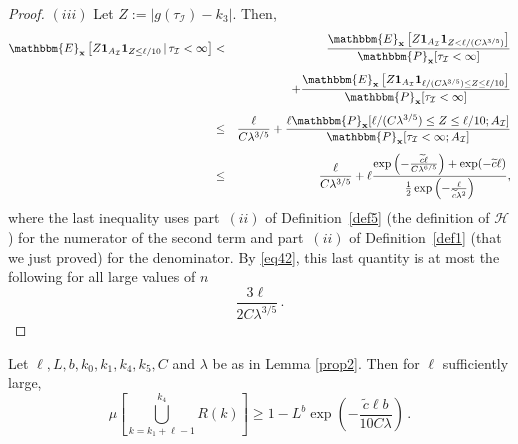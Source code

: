 \documentclass[final,12pt]{colt2018} %
\newcommand{\E}{\mathbbm{E}}
\renewcommand{\P}{\mathbbm{P}}
\newcommand{\1}{\mathbf{1}}
\def\disp{\displaystyle}
\def\cI{\mathcal{I}}
\newcommand{\wt}{\widetilde}
\def\x{{\bf x}}
\def\ct{{\wt c}}
\def\Rc{{\mathcal H}}
\begin{document}
\begin{proof}
	$(iii)$ Let $Z := |g(\tau_{\cI}) - k_3|$.  Then,
	\begin{eqnarray*}
		\E_\x \left [ Z \1_{A_{\cI}} \1_{Z \leq \ell / 10}
		\, | \,\tau_{\cI} < \infty \right ]
		& < & \frac{\E_\x \left [ Z \1_{A_{\cI}}
			\1_{Z < \ell / (C \lambda^{3/5}) } \right ]}
		{\P_{\x} [ \tau_{\cI}<\infty ]} \\[1ex]
		&& + \frac{\E_\x \left [ Z \1_{A_{\cI}}
			\1_{\ell / (C\lambda^{3/5}) \leq Z \leq \ell/10 }
			\right]}{\P_\x [ \tau_{\cI} < \infty ]} \\[1ex]
		& \leq & \frac{\ell}{C\lambda^{3/5}} +
		\frac{\ell\P_{\x} [ \ell / (C\lambda^{3/5})
			\leq Z \leq \ell/10;A_{\cI}]}{\P_\x [\tau_{\cI}<\infty;A_{\cI} ]}\\[1ex]
		& \leq & \frac{\ell}{C\lambda^{3/5}} +
		\ell
		\frac{\exp \left( -\frac{\ct \ell}{C\lambda^{6/5} }
			\right) + \exp(-\wt c\ell) }{ \frac 12 \exp \left(-\frac{\ell}{\ct \lambda^2} \right)},
	\end{eqnarray*}
	where the last inequality uses part~$(ii)$ of Definition~\ref{def5}
	(the definition of $\Rc$) for the numerator of the second term and
	part~$(ii)$ of Definition~\ref{def1} (that we just proved) for the
	denominator.  By \eqref{eq42}, this last quantity is at most the following for all large values of $n$
	$$\disp \frac{3\ell}{2C\lambda^{3/5}} \, .$$
\end{proof}

\begin{lemma} \label{prop10}
	Let $\ell, L, b, k_0, k_1, k_4, k_5, C$ and $\lambda$ be as in
	Lemma \ref{prop2}.  Then for $\ell$ sufficiently large,
	$$\mu \left [ \bigcup_{k = k_1 + \ell - 1}^{k_4} R(k) \right ] \geq
	1 - L^b \exp \left ( -\frac{\ct \ell b}{10 C \lambda} \right ) \, .$$
\end{lemma}
\end{document}
